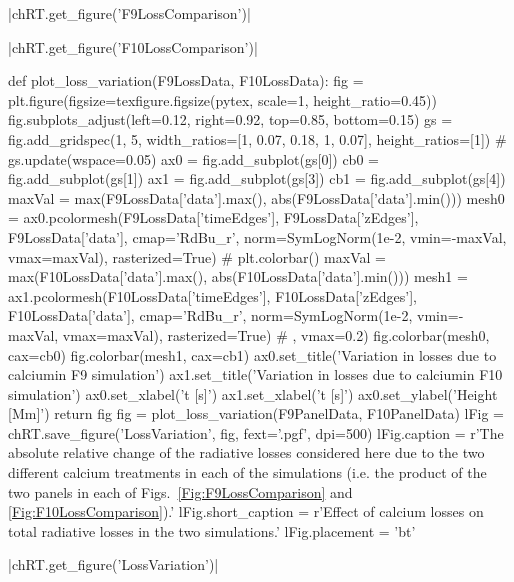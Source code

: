 \py[TimeDepRT]|chRT.get_figure('F9LossComparison')|

\py[TimeDepRT]|chRT.get_figure('F10LossComparison')|

\begin{pycode}[TimeDepRT]
def plot_loss_variation(F9LossData, F10LossData):
    fig = plt.figure(figsize=texfigure.figsize(pytex, scale=1, height_ratio=0.45))
    fig.subplots_adjust(left=0.12, right=0.92, top=0.85, bottom=0.15)
    gs = fig.add_gridspec(1, 5, width_ratios=[1, 0.07, 0.18, 1, 0.07], height_ratios=[1])
    # gs.update(wspace=0.05)
    ax0 = fig.add_subplot(gs[0])
    cb0 = fig.add_subplot(gs[1])
    ax1 = fig.add_subplot(gs[3])
    cb1 = fig.add_subplot(gs[4])
    maxVal = max(F9LossData['data'].max(), abs(F9LossData['data'].min()))
    mesh0 = ax0.pcolormesh(F9LossData['timeEdges'], F9LossData['zEdges'],
                        F9LossData['data'], cmap='RdBu_r', norm=SymLogNorm(1e-2, vmin=-maxVal, vmax=maxVal), rasterized=True)
    # plt.colorbar()
    maxVal = max(F10LossData['data'].max(), abs(F10LossData['data'].min()))
    mesh1 = ax1.pcolormesh(F10LossData['timeEdges'], F10LossData['zEdges'], F10LossData['data'],
                        cmap='RdBu_r', norm=SymLogNorm(1e-2, vmin=-maxVal, vmax=maxVal),
                        rasterized=True)
    #                        , vmax=0.2)
    fig.colorbar(mesh0, cax=cb0)
    fig.colorbar(mesh1, cax=cb1)
    ax0.set_title('Variation in losses due to calcium\ntreatment in F9 simulation')
    ax1.set_title('Variation in losses due to calcium\ntreatment in F10 simulation')
    ax0.set_xlabel('t [s]')
    ax1.set_xlabel('t [s]')
    ax0.set_ylabel('Height [Mm]')
    return fig
fig = plot_loss_variation(F9PanelData, F10PanelData)
lFig = chRT.save_figure('LossVariation', fig, fext='.pgf', dpi=500)
lFig.caption = r'The absolute relative change of the radiative losses considered here due to the two different calcium treatments in each of the simulations (i.e. the product of the two panels in each of Figs.~\ref{Fig:F9LossComparison} and \ref{Fig:F10LossComparison}).'
lFig.short_caption = r'Effect of calcium losses on total radiative losses in the two simulations.'
lFig.placement = 'bt'
\end{pycode}

\py[TimeDepRT]|chRT.get_figure('LossVariation')|


